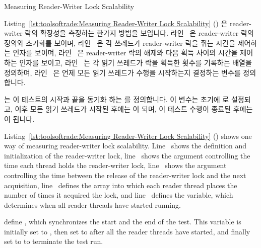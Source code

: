 \fi

\begin{listing}[tbp]

\caption{Measuring Reader-Writer Lock Scalability}
\label{lst:toolsoftrade:Measuring Reader-Writer Lock Scalability}
\end{listing}

\begin{fcvref}
Listing~\ref{lst:toolsoftrade:Measuring Reader-Writer Lock Scalability}
()
은 reader-writer 락의 확장성을 측정하는 한가지 방법을 보입니다.
라인~ 은 reader-writer 락의 정의와 초기화를 보이며,
라인~ 은 각 쓰레드가 reader-writer 락을 쥐는 시간을 제어하는
 인자를 보이며, 라인~ 은 reader-writer 락의 해제와
다음 획득 사이의 시간을 제어하는  인자를 보이고,
라인~ 는 각 읽기 쓰레드가 락을 획득한 횟수를 기록하는
 배열을 정의하며, 라인~ 은 언제 모든 읽기 쓰레드가
수행을 시작하는지 결정하는  변수를 정의합니다.

 는 이 테스트의 시작과 끝을 동기화 하는
 를 정의합니다.
이 변수는 초기에  로 설정되고, 이후 모든 읽기 쓰레드가 시작된
후에는  이 되며, 이 테스트 수행이 종료된 후에는 
이 됩니다.
\end{fcvref}

\iffalse

\begin{fcvref}
Listing~\ref{lst:toolsoftrade:Measuring Reader-Writer Lock Scalability}
()
shows one way of measuring reader-writer lock scalability.
Line~ shows the definition and initialization of the reader-writer
lock, line~ shows the  argument controlling the
time each thread holds the reader-writer lock,
line~ shows the  argument controlling the time between
the release of the reader-writer lock and the next acquisition,
line~ defines the  array into which each reader thread
places the number of times it acquired the lock, and
line~ defines the  variable, which
determines when all reader threads have started running.

 define ,
which synchronizes the start and the
end of the test.
This variable is initially set to , then set to
 after all the reader threads have started, and finally
set to  to terminate the test run.
\end{fcvref}

